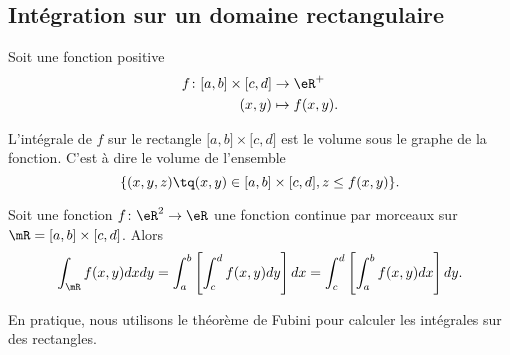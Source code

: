 \subsection{Intégration sur un domaine rectangulaire}
\label{PgRapIntMultFubiniRect}

Soit une fonction positive
\begin{equation}
    \begin{aligned}
        f\colon \mathopen[ a , b \mathclose]\times\mathopen[ c , d \mathclose]&\to \eR^+ \\
        (x,y)&\mapsto f(x,y).
    \end{aligned}
\end{equation}

L'intégrale de $f$ sur le rectangle $\mathopen[ a , b \mathclose]\times\mathopen[ c , d \mathclose]$ est le volume sous le graphe de la fonction. C'est à dire le volume de l'ensemble
\begin{equation}
    \{ (x,y,z)\tq (x,y)\in\mathopen[ a , b \mathclose]\times\mathopen[ c , d \mathclose], z\leq f(x,y) \}.
\end{equation}

\begin{theorem}
    Soit une fonction $f\colon \eR^2\to \eR$ une fonction continue par morceaux sur $\mR=\mathopen[ a , b \mathclose]\times\mathopen[ c , d \mathclose]$. Alors
    \begin{equation}
        \int_{\mR}f(x,y)dxdy=\int_a^b\left[ \int_c^df(x,y)dy \right]dx=\int_c^d\left[ \int_a^bf(x,y)dx \right]dy.
    \end{equation}
\end{theorem}

En pratique, nous utilisons le théorème de Fubini pour calculer les intégrales sur des rectangles.

